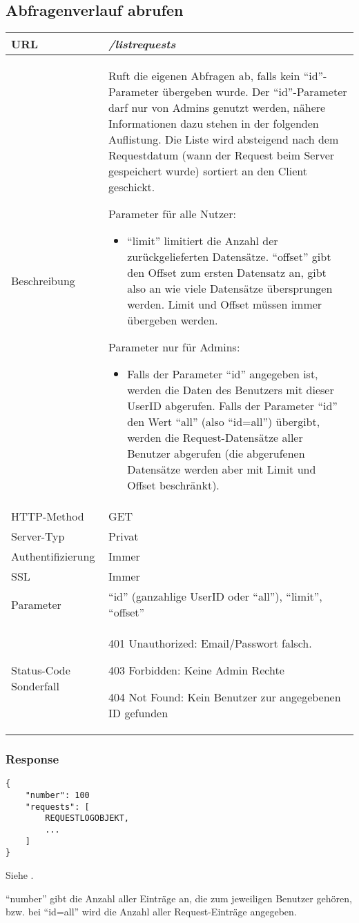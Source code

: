 \documentclass[ngerman,titlepage,parskip=true]{scrartcl}
\newcommand{\requestURL}[1]{\textit{#1}}
\newcommand{\request}[9]
{\subsection{#1}
\begin{tabular}{|p{0.2\textwidth}|p{0.7\textwidth}|}
\hline
  URL & \requestURL{#2}\\\hline
    Beschreibung & #3\\\hline
  HTTP-Method & #4\\\hline
  Server-Typ & #5\\\hline
  Authentifizierung & #6\\\hline
  SSL & #7\\\hline
  Parameter & #8\\\hline
  Status-Code Sonderfall & #9\\\hline
 \end{tabular}\vspace*{1em}}
{}%
{}%
{}%
{}%
{}%
{}%
{}%
{}%
\begin{document}
\request{Abfragenverlauf abrufen}%
{/listrequests}%
{Ruft die eigenen Abfragen ab, falls kein ``id''-Parameter übergeben wurde. Der ``id''-Parameter darf nur von Admins genutzt werden, nähere Informationen dazu stehen in der folgenden Auflistung. Die Liste wird absteigend nach dem Requestdatum (wann der Request beim Server gespeichert wurde) sortiert an den Client geschickt.
\par
Parameter für alle Nutzer:
\begin{itemize}
		\item \mbox{``limit''} limitiert die Anzahl der zurückgelieferten Datensätze. \mbox{``offset''} gibt den Offset zum ersten Datensatz an, gibt also an wie viele Datensätze übersprungen werden. Limit und Offset müssen immer übergeben werden. 
\end{itemize}

Parameter nur für Admins:
	\begin{itemize}
		\item Falls der Parameter ``id'' angegeben ist, werden die Daten des Benutzers mit dieser UserID abgerufen. Falls der Parameter ``id'' den Wert ``all'' (also \mbox{``id=all''}) übergibt, werden die Request-Datensätze aller Benutzer abgerufen (die abgerufenen Datensätze werden aber mit Limit und Offset beschränkt).
\end{itemize}
}%
{GET}%
{Privat}%
{Immer}%
{Immer}%
{``id'' (ganzahlige UserID oder ``all''), ``limit'', ``offset''}%
{401 Unauthorized: Email/Passwort falsch.\par
 403 Forbidden: Keine Admin Rechte\par
404 Not Found: Kein Benutzer zur angegebenen ID gefunden}%


	
\subsubsection{Response}		
		\begin{lstlisting}
{
	"number": 100
	"requests": [
		REQUESTLOGOBJEKT,
		...
	]
}
		\end{lstlisting}
		
Siehe .

		``number'' gibt die Anzahl aller Einträge an, die zum jeweiligen Benutzer gehören, bzw. bei \mbox{``id=all''} wird die Anzahl aller Request-Einträge angegeben.
		
	
\end{document}
